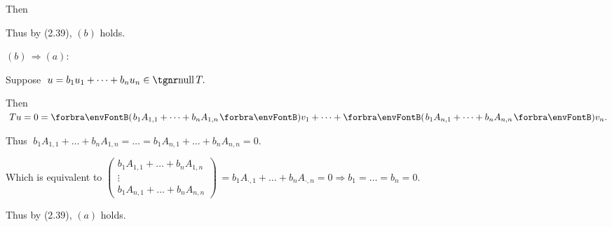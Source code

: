 \documentclass[a4paper, 11pt, UTF8]{article}
\begin{document}
\begin{large}
Then \vspace{-7.2pt}\par\quad\Ha
Thus by (2.39), $(b)$ holds.\vspace{10pt}\par\quad
$(b)\,\Rightarrow(a):\;$\par\quad\Hb
Suppose $\;u=b_1u_1+\dots+b_nu_n\in\null T.$\par\quad\Hb
Then $\;Tu=0=\Par{b_1A_{1,1}+\dots+b_nA_{1,n}}v_1+\dots+\Par{b_1A_{n,1}+\dots+b_nA_{n,n}}v_n.$\par\quad\Hb
Thus $\;b_1A_{1,1}+\dots+b_nA_{1,n}=\dots=b_1A_{n,1}+\dots+b_nA_{n,n}=0.$\vspace{6pt}\par\quad\Hb
Which is equivalent to {\;\normalsize$
	\begin{pmatrix}
		b_1 A_{1,1}+\dots+b_nA_{1,n}\\
		\vdots\\
		b_1 A_{n,1}+\dots+b_nA_{n,n}
	\end{pmatrix}$}$\,=b_1A_{\cdot,1}+\dots+b_nA_{\cdot,n}=0\Rightarrow b_1=\dots=b_n=0.$\vspace{6pt}\par\quad\Hb
Thus by (2.39), $(a)$ holds.\PfEnd
\SepLine
\pagebreak


\end{large}
\end{document}
